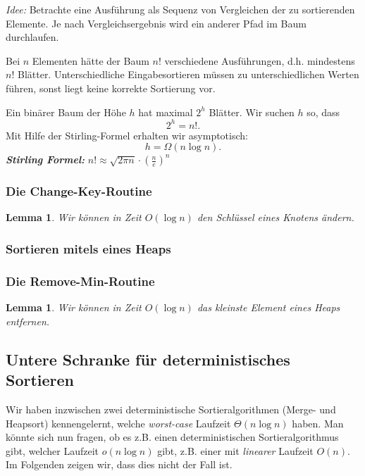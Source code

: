 \documentclass{article}
\newtheorem{lem}[thm]{Lemma}
\begin{document}
\textit{Idee:} Betrachte eine Ausführung als Sequenz von Vergleichen der zu sortierenden Elemente. Je nach Vergleichsergebnis wird ein anderer Pfad im Baum durchlaufen. 

Bei $n$ Elementen hätte der Baum $n!$ verschiedene Ausführungen, d.h. mindestens $n!$ Blätter. Unterschiedliche Eingabesortieren müssen zu unterschiedlichen Werten führen, sonst liegt keine korrekte Sortierung vor. 

Ein binärer Baum der Höhe $h$ hat maximal $2^h$ Blätter. Wir suchen $h$ so, dass
\[
2^h = n!.
\]
Mit Hilfe der Stirling-Formel erhalten wir asymptotisch:
\[
h = \Omega(n \log n).
\]
\textbf{\textit{Stirling Formel:}} $n! \approx \sqrt{2\pi n} \cdot \left(\frac{n}{e}\right)^n$



\subsubsection{Die Change-Key-Routine}

\begin{lem}
Wir können in Zeit $O(\log n)$ den Schlüssel eines Knotens ändern.
\end{lem}


\subsubsection{Sortieren mitels eines Heaps}

\subsubsection{Die Remove-Min-Routine}
\begin{lem}
Wir können in Zeit $O(\log n)$ das kleinste Element eines Heaps entfernen.
\end{lem}

\subsection{Untere Schranke für deterministisches Sortieren}
Wir haben inzwischen zwei deterministische Sortieralgorithmen (Merge- und Heapsort) kennengelernt, welche \emph{worst-case}
Laufzeit $\Theta(n\log n)$ haben.  Man könnte sich nun fragen, ob es z.B. einen deterministischen Sortieralgorithmus gibt, welcher Laufzeit $o(n\log n)$
gibt, z.B. einer mit \emph{linearer} Laufzeit $O(n)$. Im Folgenden zeigen wir, dass dies nicht der Fall ist. 
\end{document}

